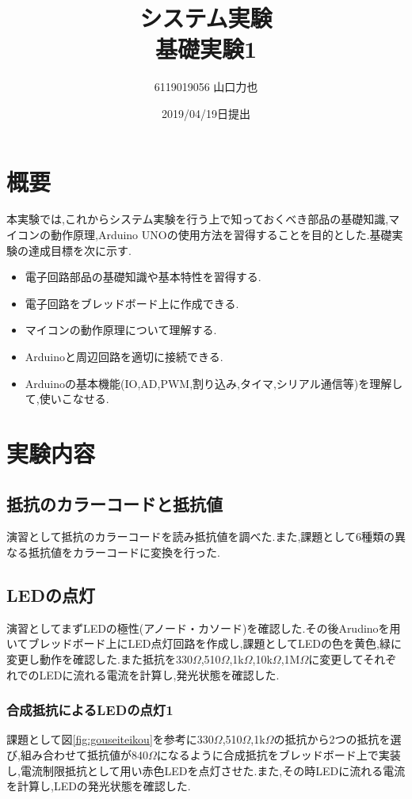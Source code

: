 \documentclass{jarticle}
\title{{システム実験}\\基礎実験1}
\author{6119019056 山口力也}
\date{2019/04/19日提出}
\begin{document}
\maketitle

\section{概要}
本実験では,これからシステム実験を行う上で知っておくべき部品の基礎知識,マイコンの動作原理,Arduino UNOの使用方法を習得することを目的とした.基礎実験の達成目標を次に示す.

\begin{itemize}

\item 電子回路部品の基礎知識や基本特性を習得する.
\item 電子回路をブレッドボード上に作成できる.
\item マイコンの動作原理について理解する.
\item Arduinoと周辺回路を適切に接続できる.
\item Arduinoの基本機能(IO,AD,PWM,割り込み,タイマ,シリアル通信等)を理解して,使いこなせる.

\end{itemize}

\section{実験内容}
\subsection{抵抗のカラーコードと抵抗値}
\label{subsec:colorcode}
演習として抵抗のカラーコードを読み抵抗値を調べた.また,課題として6種類の異なる抵抗値をカラーコードに変換を行った.
\subsection{LEDの点灯}
\label{subsec:led}
演習としてまずLEDの極性(アノード・カソード)を確認した.その後Arudinoを用いてブレッドボード上にLED点灯回路を作成し,課題としてLEDの色を黄色,緑に変更し動作を確認した.また抵抗を330$\Omega$,510$\Omega$,1k$\Omega$,10k$\Omega$,1M$\Omega$に変更してそれぞれでのLEDに流れる電流を計算し,発光状態を確認した.

\subsubsection{合成抵抗によるLEDの点灯1}
\label{subsubsec:gouseiled1}
課題として図\ref{fig:gouseiteikou}を参考に330$\Omega$,510$\Omega$,1k$\Omega$の抵抗から2つの抵抗を選び,組み合わせて抵抗値が840$\Omega$になるように合成抵抗をブレッドボード上で実装し,電流制限抵抗として用い赤色LEDを点灯させた.また,その時LEDに流れる電流を計算し,LEDの発光状態を確認した.
\end{document}
